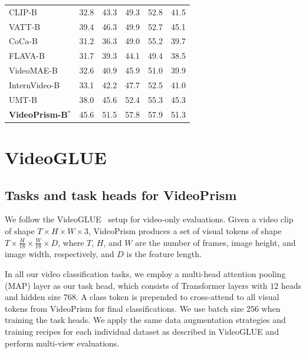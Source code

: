\documentclass{article}
\theoremstyle{plain}
\theoremstyle{definition}
\theoremstyle{remark}
\newcommand{\OURS}{VideoPrism\xspace}
\begin{document}
\begin{table}
\begin{center}
\begin{scriptsize}
\begin{tabular}{@{}l|c|c|c|c|c@{}}
\midrule
CLIP-B~\cite{radford2021learning} & 32.8 & 43.3 & 49.3 & 52.8 & 41.5 \\
VATT-B~\cite{akbari2021vatt} & 39.4 & 46.3 & 49.9 & 52.7 & 45.1 \\
CoCa-B~\cite{yu2022coca} &  31.2 & 36.3 & 49.0 & 55.2 & 39.7 \\
FLAVA-B~\cite{singh2022flava} &  31.7 & 39.3 & 44.1 & 49.4 & 38.5 \\
VideoMAE-B~\cite{tong2022videomae} & 32.6 & 40.9 & 45.9 & 51.0 & 39.9 \\
InternVideo-B~\cite{wang2022internvideo} & 33.1 & 42.2 & 47.7 & 52.5 & 41.0 \\
UMT-B~\cite{li2023unmasked} & 38.0 & 45.6 &  52.4 & 55.3 & 45.3 \\
\textbf{\OURS-B}$^\ast$ & 45.6 & 51.5 & 57.8 & 57.9 & 51.3  \\
\bottomrule
\end{tabular}
\end{scriptsize}
\end{center}
\vskip -0.1in
\end{table} 
\section{VideoGLUE}
\label{app:videoglue}

\subsection{Tasks and task heads for \OURS}
\label{app:videoglue:tasks}

We follow the VideoGLUE~\cite{yuan2023videoglue} setup for video-only evaluations.  
Given a video clip of shape $T\times H\times W\times 3$, \OURS produces a set of visual tokens of shape $T\times\frac{H}{18}\times\frac{W}{18}\times D$, where $T$, $H$, and $W$ are the number of frames, image height, and image width, respectively, and $D$ is the feature length.

In all our video classification tasks, we employ a multi-head attention pooling (MAP) layer as our task head, which consists of Transformer layers with $12$ heads and hidden size $768$. 
A class token is prepended to cross-attend to all visual tokens from \OURS for final classifications.
We use batch size $256$ when training the task heads.
We apply the same data augmentation strategies and training recipes for each individual dataset as described in VideoGLUE and perform multi-view evaluations.
\end{document}
